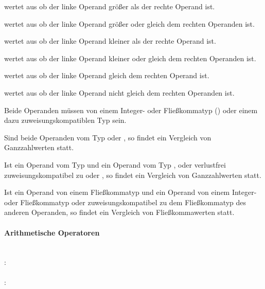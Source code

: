 \op{>} wertet aus ob der linke Operand größer als der rechte Operand ist.

\op{>=} wertet aus ob der linke Operand größer oder gleich dem rechten Operanden ist.

\op{<} wertet aus ob der linke Operand kleiner als der rechte Operand ist.

\op{<=} wertet aus ob der linke Operand kleiner oder gleich dem rechten Operanden ist.

\op{==} wertet aus ob der linke Operand gleich dem rechten Operand ist.

\op{!=} wertet aus ob der linke Operand nicht gleich dem rechten Operanden ist.

Beide Operanden müssen von einem Integer- oder Fließkommatyp () oder einem
dazu zuweisungskompatiblen Typ sein.

Sind beide Operanden vom Typ  oder , so findet ein Vergleich von Ganzzahlwerten statt.

Ist ein Operand vom Typ  und ein Operand vom Typ ,  oder
verlustfrei zuweisungskompatibel zu  oder , so findet ein Vergleich von Ganzzahlwerten statt.

Ist ein Operand von einem Fließkommatyp und ein Operand von einem Integer- oder Fließkommatyp
oder zuweisungskompatibel zu dem Fließkommatyp des anderen Operanden,
so findet ein Vergleich von Fließkommawerten statt.


\paragraph{Arithmetische Operatoren}\label{Arithmetische Operatoren}
~\\
:\label{asdr_add}\\
\hspace*{1cm} \Gspace{}\\
:\label{asdr_mult}\\
\hspace*{1cm} \Gspace{}\\

